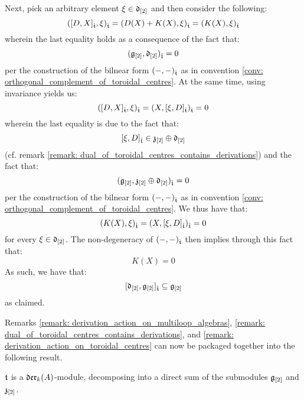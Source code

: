 \begin{remark}
            Next, pick an arbitrary element $\xi \in \mathfrak{d}_{[2]}$ and then consider the following:
                $$( [ D, X ]_{\hat{\mathfrak{t}}}, \xi )_{\hat{\mathfrak{t}}} = (D(X) + K(X), \xi)_{\hat{\mathfrak{t}}} = (K(X), \xi)_{\hat{\mathfrak{t}}}$$
            wherein the last equality holds as a consequence of the fact that:
                $$( \mathfrak{g}_{[2]}, \mathfrak{d}_{[2]} )_{\hat{\mathfrak{t}}} = 0$$
            per the construction of the bilnear form $(-, -)_{\hat{\mathfrak{t}}}$ as in convention \ref{conv: orthogonal_complement_of_toroidal_centres}. At the same time, using invariance yields us:
                $$( [ D, X ]_{\hat{\mathfrak{t}}}, \xi )_{\hat{\mathfrak{t}}} = (X, [\xi, D]_{\hat{\mathfrak{t}}})_{\hat{\mathfrak{t}}} = 0$$
            wherein the last equality is due to the fact that:
                $$[\xi, D]_{\hat{\mathfrak{t}}} \in \mathfrak{z}_{[2]} \oplus \mathfrak{d}_{[2]}$$
            (cf. remark \ref{remark: dual_of_toroidal_centres_contains_derivations}) and the fact that:
                $$( \mathfrak{g}_{[2]}, \mathfrak{z}_{[2]} \oplus \mathfrak{d}_{[2]} )_{\hat{\mathfrak{t}}} = 0$$
            per the construction of the bilnear form $(-, -)_{\hat{\mathfrak{t}}}$ as in convention \ref{conv: orthogonal_complement_of_toroidal_centres}. We thus have that:
                $$(K(X), \xi)_{\hat{\mathfrak{t}}} = (X, [\xi, D]_{\hat{\mathfrak{t}}})_{\hat{\mathfrak{t}}} = 0$$
            for every $\xi \in \mathfrak{d}_{[2]}$. The non-degeneracy of $(-, -)_{\hat{\mathfrak{t}}}$ then implies through this fact that:
                $$K(X) = 0$$
            As such, we have that:
                $$[ \mathfrak{d}_{[2]}, \mathfrak{g}_{[2]} ]_{\hat{\mathfrak{t}}} \subseteq \mathfrak{g}_{[2]}$$
            as claimed. 
        \end{remark}

        Remarks \ref{remark: derivation_action_on_multiloop_algebras}, \ref{remark: dual_of_toroidal_centres_contains_derivations}, and \ref{remark: derivation_action_on_toroidal_centres} can now be packaged together into the following result.
        \begin{proposition} \label{prop: toroidal_lie_algebras_as_modules_over_vector_field_lie_algebras}
            $\mathfrak{t}$ is a $\mathfrak{der}_{k}(A)$-module, decomposing into a direct sum of the submodules $\mathfrak{g}_{[2]}$ and $\mathfrak{z}_{[2]}$. 
        \end{proposition}

